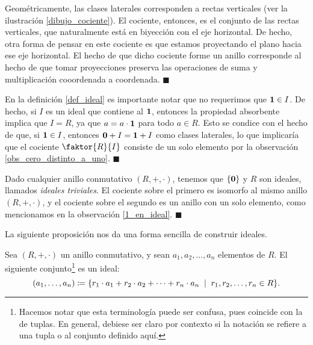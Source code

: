 \begin{example}
Geométricamente, las clases laterales corresponden a rectas verticales (ver la ilustración \ref{dibujo_cociente}). El cociente, entonces, es el conjunto de las rectas verticales, que naturalmente está en biyección con el eje horizontal. De hecho, otra forma de pensar en este cociente es que estamos proyectando el plano hacia ese eje horizontal. El hecho de que dicho cociente forme un anillo corresponde al hecho de que tomar proyecciones preserva las operaciones de suma y multiplicación cooordenada a coordenada.
\hfill$\blacksquare$
\end{example}

\begin{remark} \label{1_en_ideal}
En la definición \ref{def_ideal} es importante notar que no requerimos que $\mathbf{1} \in I$. De hecho, si $I$ es un ideal que contiene al $\mathbf{1}$, entonces la propiedad absorbente implica que $I = R$, ya que $a = a \cdot \mathbf{1}$ para todo $a \in R$. Esto se condice con el hecho de que, si $\mathbf{1} \in I$, entonces $\mathbf{0} + I = \mathbf{1} + I$ como clases laterales, lo que implicaría que el cociente $\faktor{R}{I}$ consiste de un solo elemento por la observación \ref{obs_cero_distinto_a_uno}.
\hfill$\blacksquare$
\end{remark}

\begin{example}
Dado cualquier anillo conmutativo $(R, +, \cdot)$, tenemos que $\{\mathbf{0}\}$ y $R$ son ideales, llamados \emph{ideales triviales}. El cociente sobre el primero es isomorfo al mismo anillo $(R, +, \cdot)$, y el cociente sobre el segundo es un anillo con un solo elemento, como mencionamos en la observación \ref{1_en_ideal}.
\hfill$\blacksquare$
\end{example}

La siguiente proposición nos da una forma sencilla de construir ideales.

\begin{prop} \label{ideal_generado}
Sea $(R, +, \cdot)$ un anillo conmutativo, y sean $a_1, a_2, \dots, a_n$ elementos de $R$. El siguiente conjunto\footnote{Hacemos notar que esta terminología puede ser confusa, pues coincide con la de tuplas. En general, debiese ser claro por contexto si la notación se refiere a una tupla o al conjunto definido aquí.} es un ideal: $$\left( a_1, \dots, a_n \right) \coloneqq \{r_1 \cdot a_1 + r_2 \cdot a_2 + \cdots + r_n \cdot a_n \; \mid \; r_1, r_2, \dots, r_n \in R\}.$$
\end{prop}

